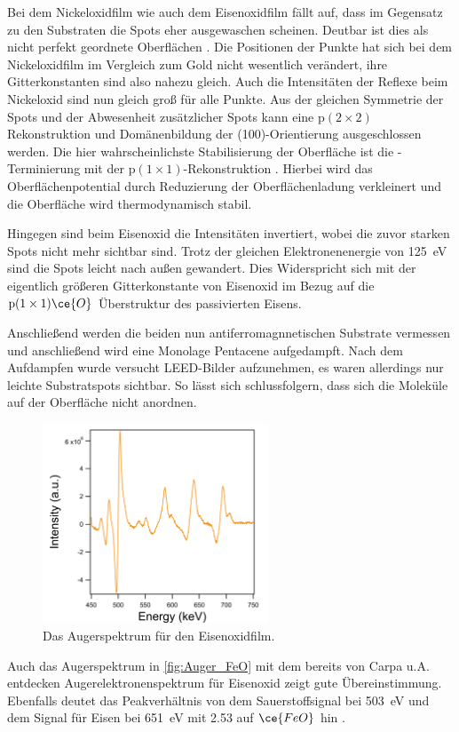         Bei dem Nickeloxidfilm wie auch dem Eisenoxidfilm fällt auf, dass im Gegensatz zu den Substraten die Spots eher ausgewaschen scheinen.
        Deutbar ist dies als nicht perfekt geordnete Oberflächen \cite{NiO_34}.
        Die Positionen der Punkte hat sich bei dem Nickeloxidfilm im Vergleich zum Gold nicht wesentlich verändert, ihre Gitterkonstanten sind also nahezu gleich.
        Auch die Intensitäten der Reflexe beim Nickeloxid sind nun gleich groß für alle Punkte.
        Aus der gleichen Symmetrie der Spots und der Abwesenheit zusätzlicher Spots kann eine $\text{p}(2 \times 2)$ Rekonstruktion \cite{NiO_37} und Domänenbildung der (100)-Orientierung \cite{NiO_36} ausgeschlossen werden.
        Die hier wahrscheinlichste Stabilisierung der Oberfläche ist die -Terminierung mit der $\text{p}(1 \times 1)$-Rekonstruktion \cite{NiO_35}.
        Hierbei wird das Oberflächenpotential durch Reduzierung der Oberflächenladung verkleinert und die Oberfläche wird thermodynamisch stabil.

        Hingegen sind beim Eisenoxid die Intensitäten invertiert, wobei die zuvor starken Spots nicht mehr sichtbar sind.
        Trotz der gleichen Elektronenenergie von \SI{125}{\electronvolt} sind die Spots leicht nach außen gewandert.
        Dies Widerspricht sich mit der eigentlich größeren Gitterkonstante von Eisenoxid im Bezug auf die $\text{p}(1 \times 1)\ce{O}$ Überstruktur des passivierten Eisens.

        Anschließend werden die beiden nun antiferromagnnetischen Substrate vermessen und anschließend wird eine Monolage Pentacene aufgedampft.
        Nach dem Aufdampfen wurde versucht LEED-Bilder aufzunehmen, es waren allerdings nur leichte Substratspots sichtbar.
        So lässt sich schlussfolgern, dass sich die Moleküle auf der Oberfläche nicht anordnen.

        \begin{figure}
            \centering
            \includegraphics[width=0.6\textwidth]{./content/pictures/FeO/2021_09_09_001_AES_FeO.png}
            \caption{Das Augerspektrum für den Eisenoxidfilm.}
            \label{fig:Auger_FeO}
        \end{figure}
        Auch das Augerspektrum in \autoref{fig:Auger_FeO} mit dem bereits von Carpa u.A. \cite{FeO_1} entdecken Augerelektronenspektrum für Eisenoxid zeigt gute Übereinstimmung.
        Ebenfalls deutet das Peakverhältnis von dem Sauerstoffsignal bei \SI{503}{\electronvolt} und dem Signal für Eisen bei \SI{651}{\electronvolt} mit \num{2.53} auf $\ce{FeO}$ hin \cite{FeO_1, Auger}.
        

